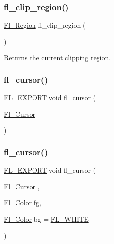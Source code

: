 \subsubsection{\texorpdfstring{fl\+\_\+clip\+\_\+region()}{fl\_clip\_region()}\hspace{0.1cm}{\footnotesize\ttfamily [2/2]}}
{\footnotesize\ttfamily \hyperlink{mac_8_h_ac80c9f95cc93c989c5a953a749f45cb6}{Fl\+\_\+\+Region} fl\+\_\+clip\+\_\+region (\begin{DoxyParamCaption}{ }\end{DoxyParamCaption})\hspace{0.3cm}{\ttfamily [inline]}}

Returns the current clipping region. \mbox{\label{group__fl__drawings_gac34f54a80fa846cf66f160bc02940bd2}} 
\subsubsection{\texorpdfstring{fl\+\_\+cursor()}{fl\_cursor()}\hspace{0.1cm}{\footnotesize\ttfamily [1/2]}}
{\footnotesize\ttfamily \hyperlink{_fl___export_8_h_aa9ba29a18aee9d738370a06eeb4470fc}{F\+L\+\_\+\+E\+X\+P\+O\+RT} void fl\+\_\+cursor (\begin{DoxyParamCaption}\item[{\hyperlink{_enumerations_8_h_a72bde974edc7926b1217dd51b8c7e8e0}{Fl\+\_\+\+Cursor}}]{ }\end{DoxyParamCaption})}

\mbox{\label{group__fl__drawings_ga55c8e6d223e29367800325c61b0d840f}} 
\subsubsection{\texorpdfstring{fl\+\_\+cursor()}{fl\_cursor()}\hspace{0.1cm}{\footnotesize\ttfamily [2/2]}}
{\footnotesize\ttfamily \hyperlink{_fl___export_8_h_aa9ba29a18aee9d738370a06eeb4470fc}{F\+L\+\_\+\+E\+X\+P\+O\+RT} void fl\+\_\+cursor (\begin{DoxyParamCaption}\item[{\hyperlink{_enumerations_8_h_a72bde974edc7926b1217dd51b8c7e8e0}{Fl\+\_\+\+Cursor}}]{,  }\item[{\hyperlink{_enumerations_8_h_a8b762953646f8abee866061f1af78a6a}{Fl\+\_\+\+Color}}]{fg,  }\item[{\hyperlink{_enumerations_8_h_a8b762953646f8abee866061f1af78a6a}{Fl\+\_\+\+Color}}]{bg = {\ttfamily \hyperlink{_enumerations_8_h_ac1600c6c32be996f90f133cdc4135292}{F\+L\+\_\+\+W\+H\+I\+TE}} }\end{DoxyParamCaption})}

